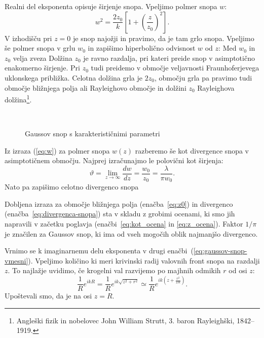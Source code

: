 Realni del eksponenta opisuje širjenje snopa. Vpeljimo polmer snopa
$w$: 
\begin{equation}
w^{2}=\frac{2z_{0}}{k}\left[1+\left(\frac{z}{z_{0}}\right)^{2}\right].
\end{equation}
V izhodišču pri $z=0$ je snop najožji in pravimo, da je tam grlo snopa. 
Vpeljimo še polmer snopa v grlu $w_0$ in zapišimo hiperbolično odvisnost $w$ od $z$:
Med $w_{0}$ in $z_{0}$ velja zveza 
Dolžina $z_{0}$ je ravno razdalja, pri kateri preide snop v asimptotično enakomerno širjenje.
Pri $z_{0}$ tudi preidemo v območje veljavnosti Fraunhoferjevega uklonskega približka. 
Celotna dolžina grla je $2z_0$, območju grla pa pravimo tudi območje bližnjega polja ali 
Rayleighovo območje in dolžini $z_0$ Rayleighova 
dolžina\footnote{Angleški fizik in nobelovec John William Strutt, 3. baron Rayleighški, 1842--1919.}.

\begin{figure}[h]
\centering
\def\svgwidth{100truemm} 
\\
\caption{Gaussov snop s karakterističnimi parametri}
\label{fig:Gauss}
\end{figure}

Iz izraza (\ref{eq:w}) za polmer snopa $w(z)$ razberemo še kot divergence snopa v
asimptotičnem območju. Najprej izračunajmo le polovični kot širjenja:
\begin{equation}
\vartheta=\lim_{z \to \infty} \frac{dw}{dz} = \frac{w_{0}}{z_{0}}=\frac{\lambda}{\pi w_{0}}.\label{eq:divergenca-snopa}
\end{equation}
Nato pa zapišimo celotno divergenco snopa

Dobljena izraza za območje bližnjega polja (enačba~\ref{eq:z0}) in divergenco 
(enačba~\ref{eq:divergenca-snopa}) sta v skladu z grobimi ocenami, ki smo jih 
napravili v začetku poglavja (enačbi~\ref{eq:kot_ocena} in \ref{eq:z_ocena}). Faktor 
$1/\pi$ je značilen za Gaussov snop, ki ima od vseh mogočih oblik 
najmanjšo divergenco.

Vrnimo se k imaginarnemu delu eksponenta v drugi enačbi~(\ref{eq:gaussov-snop-vmesni}).
Vpeljimo količino 
ki meri krivinski radij valovnih front snopa na razdalji $z$. To najlažje
uvidimo, če krogelni val razvijemo po majhnih odmikih $r$ od osi
$z$: 
\begin{equation}
\frac{1}{R}e^{ikR}=\frac{1}{R}e^{ik\sqrt{z^{2}+r^{2}}}\simeq\frac{1}{R}e^{ik(z+\frac{r^{2}}{2R})}.\label{eq:krogelni-val}
\end{equation}
 Upoštevali smo, da je na osi $z=R$.
 
